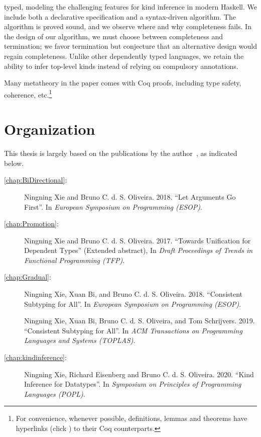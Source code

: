 \begin{description}
\begin{itemize}
\begin{itemize}
      typed, modeling the challenging features for kind inference in modern
      Haskell. We include both a declarative specification and a syntax-driven
      algorithm. The algorithm is proved sound, and we observe where and why
      completeness fails. In the design of our algorithm, we must choose between
      completeness and termination; we favor termination but conjecture that an
      alternative design would regain completeness. Unlike other dependently typed
      languages, we retain the ability to infer top-level kinds instead of relying
      on compulsory annotations.
    \end{itemize}
  \end{itemize}
\end{description}

Many metatheory in the paper comes with Coq proofs, including type safety,
coherence, etc.\footnote{For convenience, whenever possible, definitions, lemmas
  and theorems have hyperlinks (click \leftpointright) to their Coq
  counterparts. }

\section{Organization}

This thesis is largely based on the
publications by the author~\citep{esop2018:arguments,esop2018:consistent,toplas:consistent,popl:kind,tfp},
as indicated below.
\begin{description}
\item[\cref{chap:BiDirectional}:] Ningning Xie and Bruno C. d. S.
  Oliveira. 2018. ``Let Arguments Go First''. In
  \emph{European Symposium on Programming (ESOP)}.
\item[\cref{chap:Promotion}:]
  Ningning Xie and Bruno C. d. S. Oliveira.
  2017. ``Towards Unification for Dependent Types'' (Extended abstract), In \emph{Draft Proceedings
    of Trends in Functional Programming (TFP)}.
\item[\cref{chap:Gradual}:] Ningning Xie, Xuan Bi, and Bruno C. d. S.
  Oliveira. 2018. ``Consistent Subtyping for All''. In
  \emph{European Symposium on Programming (ESOP)}.
\item[\quad\quad] Ningning Xie, Xuan Bi, Bruno C. d. S.
  Oliveira, and Tom Schrijvers. 2019. ``Consistent Subtyping for All''. In
  \emph{ACM Transactions on Programming Languages and Systems (TOPLAS)}.
\item[\cref{chap:kindinference}:]
  Ningning Xie, Richard Eisenberg and Bruno C. d. S. Oliveira. 2020. ``Kind
  Inference for Datatypes''. In \emph{Symposium on Principles of Programming
    Languages (POPL)}.
\end{description}


\noindent\makebox[\linewidth]{\rule{0.7\textwidth}{0.4pt}}

\vspace{1.5\baselineskip}




